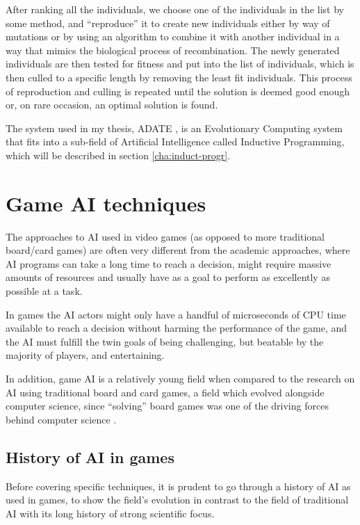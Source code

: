 After ranking all the individuals, we choose one of the individuals in the list
by some method, and ``reproduce'' it to create new individuals either by way of
mutations or by using an algorithm to combine it with another individual in a
way that mimics the biological process of recombination. The newly generated
individuals are then tested for fitness and put into the list of individuals,
which is then culled to a specific length by removing the least fit individuals.
This process of reproduction and culling is repeated until the solution is
deemed good enough or, on rare occasion, an optimal solution is found.

The system used in my thesis, ADATE \citep{olsson1995inductive}, is an
Evolutionary Computing system that fits into a sub-field of Artificial
Intelligence called Inductive Programming, which will be described in section
\ref{cha:induct-progr}.

\section{Game AI techniques}
\label{sec:game-ai-techniques}

The approaches to AI used in video games (as opposed to more traditional
board/card games) are often very different from the academic approaches, where
AI programs can take a long time to reach a decision, might require massive
amounts of resources and usually have as a goal to perform as excellently as
possible at a task.

In games the AI actors might only have a handful of microseconds of CPU time
available to reach a decision without harming the performance of the game, and
the AI must fulfill the twin goals of being challenging, but beatable by the
majority of players, and entertaining.

In addition, game AI is a relatively young field when compared to the research
on AI using traditional board and card games, a field which evolved alongside
computer science, since ``solving'' board games was one of the driving forces
behind computer science \citep{schaeffer2002games}.

\subsection{History of AI in games}
\label{sec:game-ai-history}

Before covering specific techniques, it is prudent to go through a history of AI
as used in games, to show the field's evolution in contrast to the field of
traditional AI with its long history of strong scientific focus.
\citep{tozour2002evolution}

